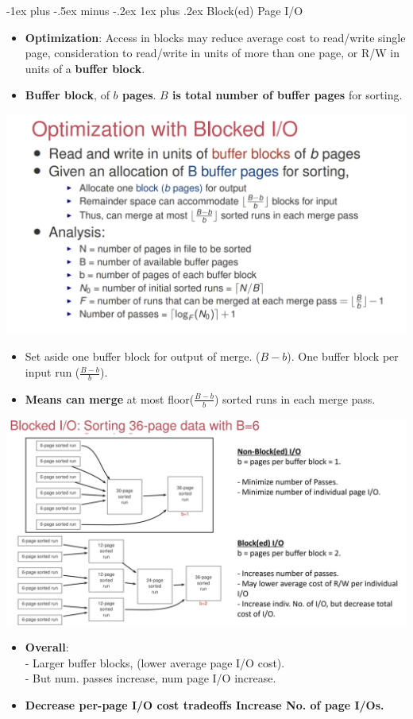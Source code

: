 \documentclass[10pt, landscape]{article}
\makeatletter
\renewcommand{\subsubsection}{\@startsection{subsubsection}{3}{0mm}%
                                {-1ex plus -.5ex minus -.2ex}%
                                {1ex plus .2ex}%
                                {\normalfont\small\bfseries}}
\makeatother
\begin{document}
\begin{multicols*}{3}
\subsubsection{Block(ed) Page I/O}
\begin{itemize}
\item \textbf{Optimization}: Access in blocks may reduce average cost to read/write single page, consideration to read/write in units of more than one page, or R/W in units of a \textbf{buffer block}.
\item \textbf{Buffer block}, of \textbf{$b$ pages}. \textbf{$B$ is total number of buffer pages} for sorting. 
\end{itemize}
\centerline{\includegraphics[width = 0.6\linewidth]{blockedIO}}
\begin{itemize}
\item Set aside one buffer block for output of merge. ($B-b$). One buffer block per input run ($\frac{B-b}{b}$). 
\item \textbf{Means can merge} at most floor($\frac{B-b}{b}$) sorted runs in each merge pass.
\end{itemize}
\centerline{\includegraphics[width = 1\linewidth]{blockedIO2}}
\begin{itemize}
\item \textbf{Overall}: \\
- Larger buffer blocks, (lower average page I/O cost). \\
- But num. passes increase, num page I/O increase. 
\item \textbf{Decrease per-page I/O cost tradeoffs Increase No. of page I/Os.}
\end{itemize}


\end{multicols*}
\end{document}
